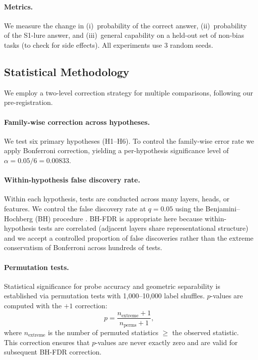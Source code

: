 \paragraph{Metrics.}  We measure the change in (i)~probability of the
correct answer, (ii)~probability of the S1-lure answer, and (iii)~general
capability on a held-out set of non-bias tasks (to check for side effects).
All experiments use 3 random seeds.

\subsection{Statistical Methodology}
\label{sec:stats}

We employ a two-level correction strategy for multiple comparisons,
following our pre-registration.

\paragraph{Family-wise correction across hypotheses.}
We test six primary hypotheses (H1--H6).  To control the family-wise error
rate we apply Bonferroni correction, yielding a per-hypothesis significance
level of $\alpha = 0.05/6 = 0.00833$.

\paragraph{Within-hypothesis false discovery rate.}
Within each hypothesis, tests are conducted across many layers, heads, or
features.  We control the false discovery rate at $q = 0.05$ using the
Benjamini--Hochberg (BH) procedure \citep{benjamini1995controlling}.
BH-FDR is appropriate here because within-hypothesis tests are correlated
(adjacent layers share representational structure) and we accept a
controlled proportion of false discoveries rather than the extreme
conservatism of Bonferroni across hundreds of tests.

\paragraph{Permutation tests.}
Statistical significance for probe accuracy and geometric separability is
established via permutation tests with 1{,}000--10{,}000 label shuffles.
$p$-values are computed with the \citet{north2002note} $+1$ correction:
\begin{equation}
  p = \frac{n_{\text{extreme}} + 1}{n_{\text{perms}} + 1},
  \label{eq:north}
\end{equation}
where $n_{\text{extreme}}$ is the number of permuted statistics $\geq$ the
observed statistic.  This correction ensures that $p$-values are never
exactly zero and are valid for subsequent BH-FDR correction.

